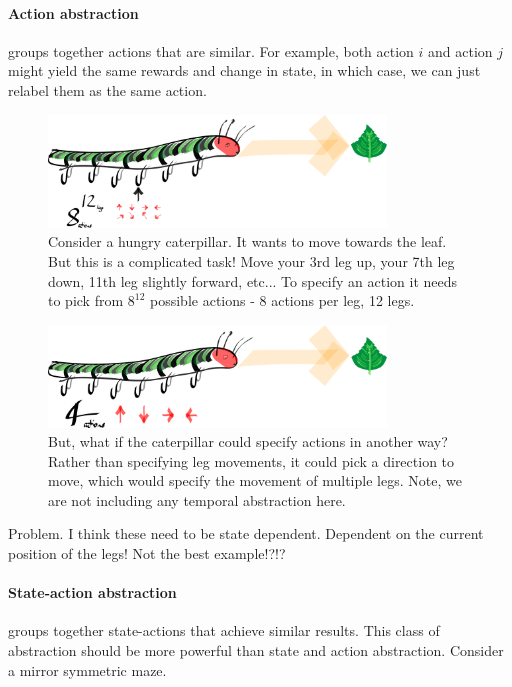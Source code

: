 \paragraph{Action abstraction} groups together actions that are similar. For
example, both action $i$ and action $j$ might yield the same rewards and change in state,
in which case, we can just relabel them as the same action.

\begin{figure}[h!]
\centering
\includegraphics[width=0.8\textwidth,height=0.2\textheight]{../../pictures/drawings/hungry-caterpillar.png}
\caption{Consider a hungry caterpillar. It wants to move towards the leaf.
But this is a complicated task! Move your 3rd leg up, your 7th leg down, 11th leg slightly forward, etc...
To specify an action it needs to pick from $8^{12}$ possible actions - 8 actions per leg, 12 legs.}
\end{figure}


\begin{figure}[h!]
\centering
\includegraphics[width=0.8\textwidth,height=0.2\textheight]{../../pictures/drawings/full-caterpillar.png}
\caption{But, what if the caterpillar could specify actions in another way? Rather than specifying leg movements, it could pick a direction to move, which would specify the movement of multiple legs. Note, we are not including any temporal abstraction here.}
\end{figure}

{\color{red}Problem. I think these need to be state dependent. Dependent on the current position of the legs! Not the best example!?!?}

\paragraph{State-action abstraction} groups together state-actions that achieve similar results.
This class of abstraction should be more powerful than state and action abstraction. Consider a mirror symmetric maze.

